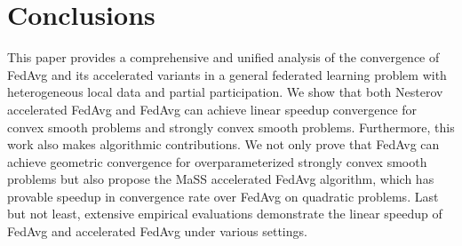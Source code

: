 
\section{Conclusions}
\begin{comment}
This paper provides a comprehensive and unified analysis of the convergence rate of FedAvg
and its accelerated variants in a general federated learning problem with heterogeneous local data and partial participation. We show that both Nesterov accelerated FedAvg and FedAvg
can achieve {\small{$\cO(\frac{1}{\sqrt{NT}})$}} linear speedup convergence for convex smooth problems and {\small{$\cO(\frac{1}{NT})$}} convergence for strongly 
convex smooth problems. In addition, we show that the local steps for stronlgy convex and convex smooth problems can be as large as {\small{$\cO(\sqrt{\frac{T}{N}})$}}, which can substantially save communication cost comparing to prior results. 
Furthermore, this work also makes algorithmic contributions. We not only prove that FedAvg can achieve exponential convergence for overparameterized strongly convex smooth problems, but also propose the MaSS accelerated Fedavg algorithm, which has provable speedup in convergence rate over FedAvg on quadratic problems. Last but not least, we empirically
verify the linear speedup of FedAvg and Nesterov accelerated FedAvg for strongly convex, convex smooth, and linear regression problems. The empirical results are well-aligned with our theories.		
\end{comment}
\vspace{-1em}
This paper provides a comprehensive and unified analysis of the convergence of FedAvg
and its accelerated variants in a general federated learning problem with heterogeneous local data and partial participation. 
We show that both Nesterov accelerated FedAvg and FedAvg can achieve linear speedup convergence for convex smooth problems and strongly 
convex smooth problems.  
Furthermore, this work also makes algorithmic contributions. We not only prove that FedAvg can achieve geometric convergence for overparameterized strongly convex smooth problems 
but also propose the MaSS accelerated FedAvg algorithm, which has provable speedup in convergence rate over FedAvg on quadratic problems. Last but not least, extensive empirical 
evaluations demonstrate the linear speedup of FedAvg and accelerated FedAvg under various settings.	

